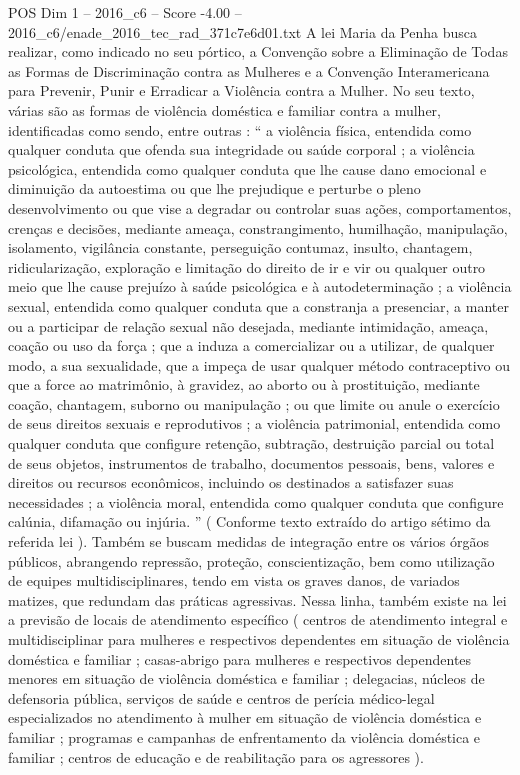 \begin{textsample}{POS Dim 1 – 2016\_c6 – Score -4.00 – 2016\_c6/enade\_2016\_tec\_rad\_371c7e6d01.txt}
A lei Maria da Penha busca realizar, como indicado no seu pórtico, a Convenção sobre a Eliminação de Todas as Formas de Discriminação contra as Mulheres e a Convenção Interamericana para Prevenir, Punir e Erradicar a Violência contra a Mulher.
No seu texto, várias são as formas de violência doméstica e familiar contra a mulher, identificadas como sendo, entre outras : “ a violência física, entendida como qualquer conduta que ofenda sua integridade ou saúde corporal ; a violência psicológica, entendida como qualquer conduta que lhe cause dano emocional e diminuição da autoestima ou que lhe prejudique e perturbe o pleno desenvolvimento ou que vise a degradar ou controlar suas ações, comportamentos, crenças e decisões, mediante ameaça, constrangimento, humilhação, manipulação, isolamento, vigilância constante, perseguição contumaz, insulto, chantagem, ridicularização, exploração e limitação do direito de ir e vir ou qualquer outro meio que lhe cause prejuízo à saúde psicológica e à autodeterminação ; a violência sexual, entendida como qualquer conduta que a constranja a presenciar, a manter ou a participar de relação sexual não desejada, mediante intimidação, ameaça, coação ou uso da força ; que a induza a comercializar ou a utilizar, de qualquer modo, a sua sexualidade, que a impeça de usar qualquer método contraceptivo ou que a force ao matrimônio, à gravidez, ao aborto ou à prostituição, mediante coação, chantagem, suborno ou manipulação ; ou que limite ou anule o exercício de seus direitos sexuais e reprodutivos ; a violência patrimonial, entendida como qualquer conduta que configure retenção, subtração, destruição parcial ou total de seus objetos, instrumentos de trabalho, documentos pessoais, bens, valores e direitos ou recursos econômicos, incluindo os destinados a satisfazer suas necessidades ; a violência moral, entendida como qualquer conduta que configure calúnia, difamação ou injúria. ” ( Conforme texto extraído do artigo sétimo da referida lei ).
Também se buscam medidas de integração entre os vários órgãos públicos, abrangendo repressão, proteção, conscientização, bem como utilização de equipes multidisciplinares, tendo em vista os graves danos, de variados matizes, que redundam das práticas agressivas.
Nessa linha, também existe na lei a previsão de locais de atendimento específico ( centros de atendimento integral e multidisciplinar para mulheres e respectivos dependentes em situação de violência doméstica e familiar ; casas-abrigo para mulheres e respectivos dependentes menores em situação de violência doméstica e familiar ; delegacias, núcleos de defensoria pública, serviços de saúde e centros de perícia médico-legal especializados no atendimento à mulher em situação de violência doméstica e familiar ; programas e campanhas de enfrentamento da violência doméstica e familiar ; centros de educação e de reabilitação para os agressores ).

\end{textsample}

